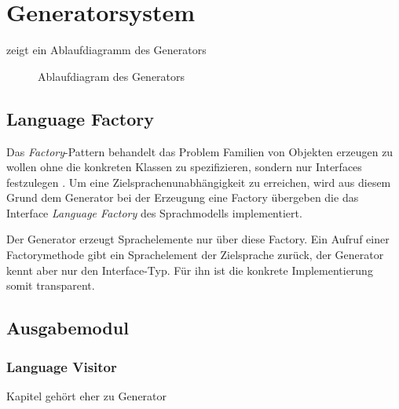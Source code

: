 \section{Generatorsystem}
\label{sec:generatorsystem}

 zeigt ein Ablaufdiagramm des Generators

\begin{sidewaysfigure}
    \centering
    \resizebox{0.9\textwidth}{!}{
        
    } 
    \caption{Ablaufdiagram des Generators}
    \label{fig:generation_process}
\end{sidewaysfigure}

\subsection{Language Factory}
\label{sec:language_factory}

Das \emph{Factory}-Pattern behandelt das Problem Familien von Objekten erzeugen zu wollen ohne die konkreten Klassen zu spezifizieren, sondern nur Interfaces festzulegen \cite[][S. 26]{patternsKompakt}.
Um eine Zielsprachenunabhängigkeit zu erreichen, wird aus diesem Grund dem Generator bei der Erzeugung eine Factory übergeben die das Interface \emph{Language Factory} des Sprachmodells implementiert. 

Der Generator erzeugt Sprachelemente nur über diese Factory. Ein Aufruf einer Factorymethode gibt ein Sprachelement der Zielsprache zurück, der Generator kennt aber nur den Interface-Typ. Für ihn ist die konkrete Implementierung somit transparent.

\subsection{Ausgabemodul}
\label{sec:printer}

\subsubsection{Language Visitor}
\label{sec:language_visitor}

Kapitel gehört eher zu Generator
